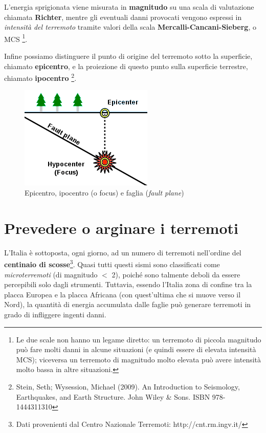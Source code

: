 \documentclass[a4paper,10pt]{memoir}
\begin{document}
L'energia sprigionata viene misurata in \textbf{magnitudo} su una scala di valutazione chiamata \textbf{Richter}, mentre gli eventuali danni provocati vengono espressi in \textit{intensità del terremoto} tramite valori della scala \textbf{Mercalli-Cancani-Sieberg}, o MCS \footnote{Le due scale non hanno un legame diretto: un terremoto di piccola magnitudo può fare molti danni in alcune situazioni (e quindi essere di elevata intensità MCS); viceversa un terremoto di magnitudo molto elevata può avere intensità molto bassa in altre situazioni.}.

Infine possiamo distinguere il punto di origine del terremoto sotto la superficie, chiamato \textbf{epicentro}, e la proiezione di questo punto sulla superficie terrestre, chiamato \textbf{ipocentro} \footnote{Stein, Seth; Wysession, Michael (2009). An Introduction to Seismology, Earthquakes, and Earth Structure. John Wiley \& Sons. ISBN 978-1444311310}.

\begin{figure}[ht]
\label{fig:epiipo}
\caption{Epicentro, ipocentro (o focus) e faglia (\textit{fault plane})}
\centering
\includegraphics[scale=0.5]{introduzione/epicenter_diagram}
\end{figure}


\section{Prevedere o arginare i terremoti}

L'Italia è sottoposta, ogni giorno, ad un numero di terremoti nell'ordine del \textbf{centinaio di scosse}\footnote{Dati provenienti dal Centro Nazionale Terremoti: http://cnt.rm.ingv.it/}. Quasi tutti questi sismi sono classificati come \textit{microterremoti} (di magnitudo $<$ 2), poiché sono talmente deboli da essere percepibili solo dagli strumenti. Tuttavia, essendo l'Italia zona di confine tra la placca Europea e la placca Africana (con quest'ultima che si muove verso il Nord), la quantità di energia accumulata dalle faglie può generare terremoti in grado di infliggere ingenti danni.
\end{document}
